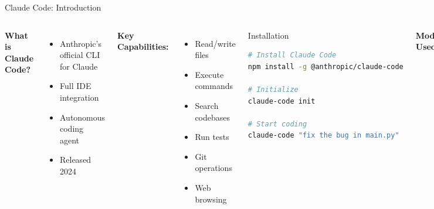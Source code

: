 \documentclass[aspectratio=169]{beamer}
\begin{document}
\begin{frame}[fragile]{Claude Code: Introduction}
	\begin{columns}
		\textbf{What is Claude Code?}
		\begin{itemize}
			\item {\color{highlight}Anthropic's official CLI} for Claude
			\item Full IDE integration
			\item Autonomous coding agent
			\item Released 2024
		\end{itemize}
		
		\textbf{Key Capabilities:}
		\begin{itemize}
			\item Read/write files
			\item Execute commands
			\item Search codebases
			\item Run tests
			\item Git operations
			\item Web browsing
		\end{itemize}
		
		\begin{block}{Installation}
			\footnotesize
			\begin{lstlisting}[language=bash]
# Install Claude Code
npm install -g @anthropic/claude-code

# Initialize
claude-code init

# Start coding
claude-code "fix the bug in main.py"
			\end{lstlisting}
		\end{block}
		
		\textbf{Models Used:}
		\begin{itemize}
			\item Haiku 3.5 (quota check)
			\item Sonnet 4 (main agent)
			\item Opus 4.1 (complex tasks)
		\end{itemize}
	\end{columns}
\end{frame}
\end{document}
